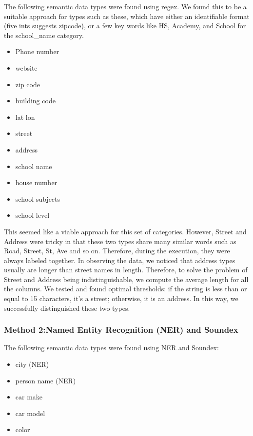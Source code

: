 \documentclass[sigconf,authordraft]{acmart}
\begin{document}
The following semantic data types were found using regex. We found this to be a suitable approach for types such as these, which have either an identifiable format (five ints suggests zipcode), or a few key words like HS, Academy, and School for the school\_name category.
\begin{itemize}
    \item Phone number
    \item website
    \item zip code
    \item building code
    \item lat lon
    \item street
    \item address
    \item school name
    \item house number
    \item school subjects
    \item school level
\end{itemize}

This seemed like a viable approach for this set of categories. However, Street and Address were tricky in that these two types share many similar words such as Road, Street, St, Ave and so on. Therefore, during the execution, they were always labeled together. In observing the data, we noticed that address types usually are longer than street names in length. Therefore, to solve the problem of Street and Address being indistinguishable, we compute the average length for all the columns. We tested and found optimal thresholds: if the string is less than or equal to 15 characters, it's a street; otherwise, it is an address. In this way, we successfully distinguished these two types. \newline 

\subsubsection{Method 2:Named Entity Recognition (NER) and Soundex}
The following semantic data types were found using NER and Soundex:
\begin{itemize}
    \item city (NER)
    \item person name (NER)
    \item car make
    \item car model
    \item color
\end{itemize}
\end{document}
